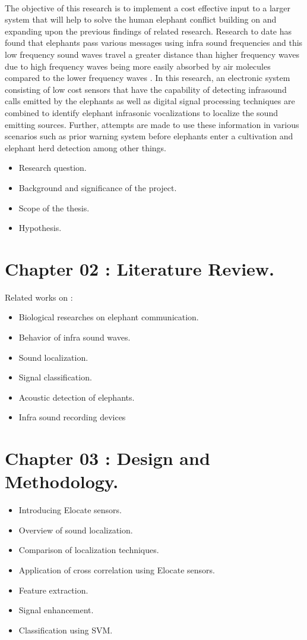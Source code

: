 \documentclass[11pt]{article}
\numberwithin{figure}{section}
\numberwithin{table}{section}
\begin{document}
\paragraph{}
The objective of this research is to implement  a cost effective input to a larger system that will help to solve the human elephant conflict building on and expanding upon the previous findings of related research. Research to date has found that elephants pass various messages using infra sound frequencies and this low frequency sound waves travel a greater distance than higher frequency waves  due to high frequency waves being more easily absorbed by air molecules compared to the lower frequency waves \cite {5}. In this research, an electronic system consisting of low cost sensors that have the capability of detecting infrasound calls emitted by the elephants as well as digital signal processing techniques are combined to  identify elephant  infrasonic vocalizations to localize the sound emitting sources. Further, attempts are made to use these information in various scenarios such as prior warning system before elephants enter a cultivation and elephant herd detection among other things.
 
\begin{itemize} 
  \item Research question.
  \item Background and significance of the project.
  \item Scope of the thesis.
  \item Hypothesis.
\end{itemize}

\section*{Chapter 02 : Literature Review.}
Related works on :
\begin{itemize}
  \item Biological researches on elephant communication. 
  \item Behavior of infra sound waves.
  \item Sound localization.
  \item Signal classification.
  \item Acoustic detection of elephants.
  \item Infra sound recording devices
\end{itemize}
\section*{Chapter 03 : Design and Methodology.}
\begin{itemize}
  \item Introducing Elocate sensors.
  \item Overview of sound localization. 
  \item Comparison of localization techniques.
  \item Application of cross correlation using Elocate sensors.
  \item Feature extraction.
  \item Signal enhancement.
  \item Classification using SVM.
\end{itemize}
\end{document}
